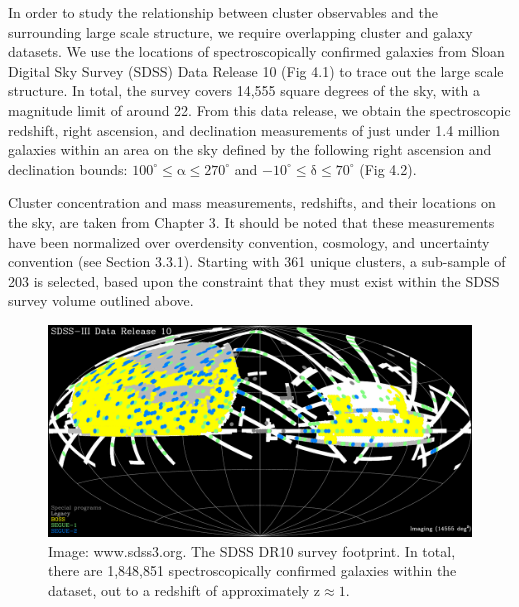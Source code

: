 In order to study the relationship between cluster observables and the
surrounding large scale structure, we require overlapping cluster and galaxy
datasets. We use the locations of spectroscopically confirmed galaxies from
Sloan Digital Sky Survey (SDSS) Data Release 10 (Fig 4.1) to trace out the large scale
structure. In total, the survey covers 14,555 square degrees of the sky, with a
magnitude limit of around 22. From this data release, we obtain the
spectroscopic redshift, right ascension, and declination measurements of just
under 1.4 million galaxies within an area on the sky defined by the following right
ascension and declination bounds: $\mathrm{100^{\circ} \le \alpha \le
  270^{\circ}}$ and $\mathrm{ -10^{\circ} \le \delta \le 70^{\circ} }$ (Fig 4.2).

Cluster concentration and mass measurements, redshifts, and their locations on
the sky, are taken from Chapter 3. It should be noted that these
measurements have been normalized over overdensity convention, cosmology, and
uncertainty convention (see Section 3.3.1). Starting with 361
unique clusters, a sub-sample of 203 is selected, based upon the constraint
that they must exist within the SDSS survey volume outlined above.

\begin{figure}
\begin{center}
\includegraphics[width=\textwidth]{images/ClusterEnvironment/dr10_spectro_coverage.png}
\end{center}
\caption[The SDSS DR10 Footprint]{Image: www.sdss3.org. The SDSS DR10 survey
  footprint. In total, there are 1,848,851 spectroscopically confirmed galaxies
  within the dataset, out to a redshift of approximately $\mathrm{z \approx 1}$.}
\end{figure}

